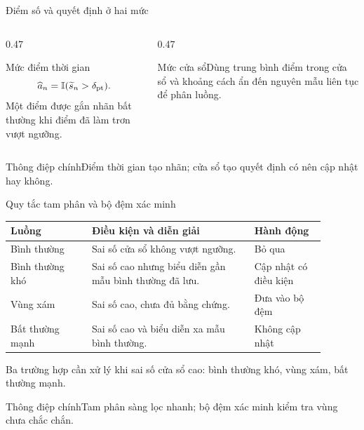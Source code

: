 \documentclass[aspectratio=169]{beamer}
\newcommand{\takeaway}[1]{\begin{alertblock}{Thông điệp chính}#1\end{alertblock}}
\begin{document}
\begin{frame}{Điểm số và quyết định ở hai mức}
  \begin{columns}[T,onlytextwidth]
    \begin{column}{0.47\textwidth}\begin{block}{Mức điểm thời gian}\[\widehat a_n=\mathbb I(\widetilde s_n>\delta_{\rm pt}).\]Một điểm được gắn nhãn bất thường khi điểm đã làm trơn vượt ngưỡng.\end{block}\end{column}
    \begin{column}{0.47\textwidth}\begin{exampleblock}{Mức cửa sổ}Dùng trung bình điểm trong cửa sổ và khoảng cách ẩn đến nguyên mẫu liên tục để phân luồng.\end{exampleblock}\end{column}
  \end{columns}
  \takeaway{Điểm thời gian tạo nhãn; cửa sổ tạo quyết định có nên cập nhật hay không.}
\end{frame}

\begin{frame}{Quy tắc tam phân và bộ đệm xác minh}
  \scriptsize
  \begin{tabular}{>{\raggedright\arraybackslash}p{0.23\linewidth} >{\raggedright\arraybackslash}p{0.46\linewidth} >{\raggedright\arraybackslash}p{0.20\linewidth}}
    \toprule
    Luồng & Điều kiện và diễn giải & Hành động \\
    \midrule
    Bình thường & Sai số cửa sổ không vượt ngưỡng. & Bỏ qua \\
    Bình thường khó & Sai số cao nhưng biểu diễn gần mẫu bình thường đã lưu. & Cập nhật có điều kiện \\
    Vùng xám & Sai số cao, chưa đủ bằng chứng. & Đưa vào bộ đệm \\
    Bất thường mạnh & Sai số cao và biểu diễn xa mẫu bình thường. & Không cập nhật \\
    \bottomrule
  \end{tabular}
  \begin{center}\small Ba trường hợp cần xử lý khi sai số cửa sổ cao: bình thường khó, vùng xám, bất thường mạnh.\end{center}
  \takeaway{Tam phân sàng lọc nhanh; bộ đệm xác minh kiểm tra vùng chưa chắc chắn.}
\end{frame}
\end{document}
